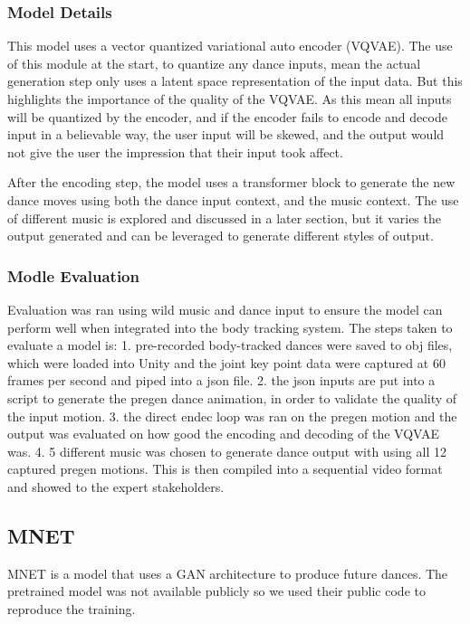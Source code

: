 \documentclass[final,5p,times,authoryear]{article}
\begin{document}
\subsubsection{Model Details}
This model uses a vector quantized variational auto encoder (VQVAE). The use of
this module at the start, to quantize any dance inputs, mean the actual
generation step only uses a latent space representation of the input data. But
this highlights the importance of the quality of the VQVAE. As this mean all
inputs will be quantized by the encoder, and if the encoder fails to encode and
decode input in a believable way, the user input will be skewed, and the output
would not give the user the impression that their input took affect. 

After the encoding step, the model uses a transformer block to generate the new
dance moves using both the dance input context, and the music context. The use
of different music is explored and discussed in a later section, but it varies
the output generated and can be leveraged to generate different styles of
output.

\subsubsection{Modle Evaluation}
Evaluation was ran using wild music and dance input to ensure the model can
perform well when integrated into the body tracking system. The steps taken to
evaluate a model is: 1. pre-recorded body-tracked dances were saved to obj files, which were
loaded into Unity and the joint key point data were captured at 60 frames per
second and piped into a json file. 2. the json inputs are put into a script to generate
the pregen dance animation, in order to validate the quality of the input
motion. 3. the direct endec loop was ran on the pregen motion and the output was
evaluated on how good the encoding and decoding of the VQVAE was. 4. 5 different
music was chosen to generate dance output with using all 12 captured pregen
motions. This is then compiled into a sequential video format and showed to the
expert stakeholders.

\subsection{MNET}

MNET is a model that uses a GAN architecture to produce future dances. The
pretrained model was not available publicly so we used their public code to
reproduce the training.
\end{document}
